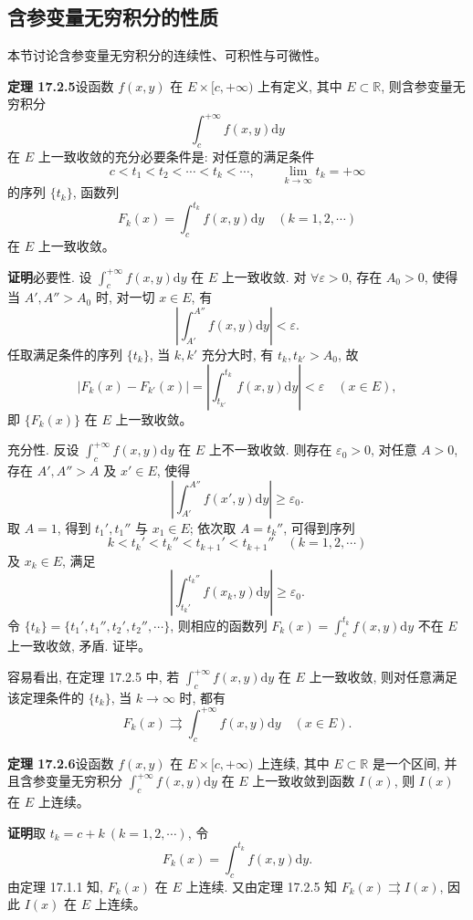 \documentclass[UTF8, 12pt, fontset=fandol, oneside]{ctexart}
\begin{document}
\subsection{含参变量无穷积分的性质}

本节讨论含参变量无穷积分的连续性、可积性与可微性。

\noindent\textbf{定理 17.2.5}\quad 设函数 $f(x,y)$ 在 $E\times[c,+\infty)$ 上有定义, 其中 $E\subset\mathbb R$, 则含参变量无穷积分
\[
  \int_c^{+\infty}f(x,y)\mathrm dy
\]
在 $E$ 上一致收敛的充分必要条件是: 对任意的满足条件
\[
  c<t_1<t_2<\cdots<t_k<\cdots,\qquad \lim_{k\to\infty}t_k=+\infty
\]
的序列 $\{t_k\}$, 函数列
\[
  F_k(x)=\int_c^{t_k}f(x,y)\mathrm dy\quad(k=1,2,\cdots)
\]
在 $E$ 上一致收敛。

\noindent\textbf{证明}\quad 必要性. 设 $\int_c^{+\infty}f(x,y)\mathrm dy$ 在 $E$ 上一致收敛. 对 $\forall\varepsilon>0$, 存在 $A_0>0$, 使得当 $A',A''>A_0$ 时, 对一切 $x\in E$, 有
\[
  \left|\int_{A'}^{A''}f(x,y)\mathrm dy\right|<\varepsilon.
\]
任取满足条件的序列 $\{t_k\}$, 当 $k,k'$ 充分大时, 有 $t_k,t_{k'}>A_0$, 故
\[
  |F_k(x)-F_{k'}(x)|
  =\left|\int_{t_{k'}}^{t_k}f(x,y)\mathrm dy\right|<\varepsilon
  \quad(x\in E),
\]
即 $\{F_k(x)\}$ 在 $E$ 上一致收敛。

充分性. 反设 $\int_c^{+\infty}f(x,y)\mathrm dy$ 在 $E$ 上不一致收敛. 则存在 $\varepsilon_0>0$, 对任意 $A>0$, 存在 $A',A''>A$ 及 $x'\in E$, 使得
\[
  \left|\int_{A'}^{A''}f(x',y)\mathrm dy\right|\geqslant\varepsilon_0.
\]
取 $A=1$, 得到 $t_1',t_1''$ 与 $x_1\in E$; 依次取 $A=t_k''$, 可得到序列
\[
  k<t_k'<t_k''<t_{k+1}'<t_{k+1}''\quad(k=1,2,\cdots)
\]
及 $x_k\in E$, 满足
\[
  \left|\int_{t_k'}^{t_k''}f(x_k,y)\mathrm dy\right|\geqslant\varepsilon_0.
\]
令 $\{t_k\}=\{t_1',t_1'',t_2',t_2'',\cdots\}$, 则相应的函数列 $F_k(x)=\int_c^{t_k}f(x,y)\mathrm dy$ 不在 $E$ 上一致收敛, 矛盾. 证毕。

容易看出, 在定理 17.2.5 中, 若 $\int_c^{+\infty}f(x,y)\mathrm dy$ 在 $E$ 上一致收敛, 则对任意满足该定理条件的 $\{t_k\}$, 当 $k\to\infty$ 时, 都有
\[
  F_k(x)\rightrightarrows \int_c^{+\infty}f(x,y)\mathrm dy\quad(x\in E).
\]

\noindent\textbf{定理 17.2.6}\quad 设函数 $f(x,y)$ 在 $E\times[c,+\infty)$ 上连续, 其中 $E\subset\mathbb R$ 是一个区间, 并且含参变量无穷积分 $\int_c^{+\infty}f(x,y)\mathrm dy$ 在 $E$ 上一致收敛到函数 $I(x)$, 则 $I(x)$ 在 $E$ 上连续。

\noindent\textbf{证明}\quad 取 $t_k=c+k\ (k=1,2,\cdots)$, 令
\[
  F_k(x)=\int_c^{t_k}f(x,y)\mathrm dy.
\]
由定理 17.1.1 知, $F_k(x)$ 在 $E$ 上连续. 又由定理 17.2.5 知 $F_k(x)\rightrightarrows I(x)$, 因此 $I(x)$ 在 $E$ 上连续。
\end{document}
